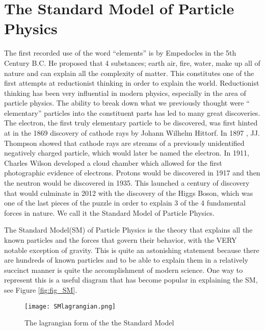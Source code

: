 \chapter{The Standard Model of Particle Physics}
\label{chap:intro}

The first recorded use of the word ``elements'' is by Empedocles in the 5th Century B.C. He proposed that 4 substances; earth air, fire, water, make up all of nature and can explain all the complexity of matter. 
This constitutes one of the first attempts at reductionist thinking in order to explain the world. Reductionist thinking has been very influential in modern physics, especially in the area of particle physics. 
The ability to break down what we previously thought were `` elementary'' particles into the constituent parts has led to many great discoveries. 
The electron, the first truly elementary particle to be discovered, was first hinted at in the 1869 discovery of cathode rays by Johann Wilhelm Hittorf. 
In 1897 , JJ. Thompson showed that cathode rays are streams of a previously unidentified negatively charged particle, which would later be named the electron. 
In 1911, Charles Wilson developed a cloud chamber which allowed for the first photographic evidence of electrons. Protons would be discovered in 1917 and then the neutron would be discovered in 1935. 
This launched a century of discovery that would culminate in 2012 with the discovery of the Higgs Boson, which was one of the last pieces of the puzzle in order to explain 3 of the 4 fundamental forces in nature. We call it the Standard Model of Particle Physics.

The Standard Model(SM) of Particle Physics is the theory that explains all the known particles and the forces that govern their behavior, with the VERY notable exception of gravity. 
This is quite an astonishing statement because there are hundreds of known particles and to be able to explain them in a relatively succinct manner is quite the accomplishment of modern science. 
One way to represent this is a useful diagram that has become popular in explaining the SM, see Figure \ref{fig:fig_SM}. 
\begin{figure} %
    \centering
    \texttt{[image: SMlagrangian.png]}
    \caption{The lagrangian form of the the Standard Model}
    \label{fig:fig_1-1}
 \end{figure}

